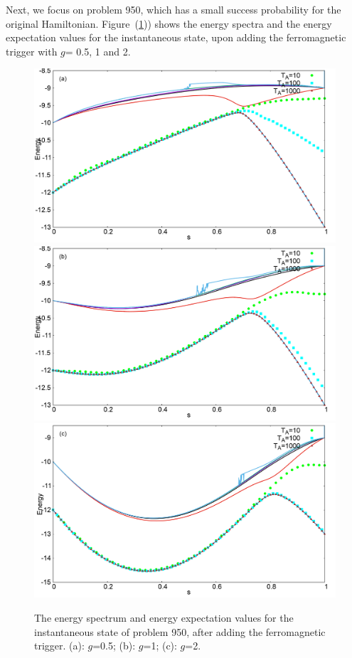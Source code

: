 \documentclass[../main.tex]{subfiles}
\begin{document}
Next, we focus on problem 950, which has a small success probability for the original Hamiltonian. Figure~(\ref{fig:f4})) shows the energy spectra and the energy expectation values for the instantaneous state, upon adding the ferromagnetic trigger with $g$= 0.5, 1 and 2. 
\begin{figure}[H]
\centering 
\includegraphics[scale=0.24]{950_s12_F_g0.png}
\includegraphics[scale=0.24]{950_s12_F_g1.png}
\includegraphics[scale=0.24]{950_s12_F_g2.png}
\caption{The energy spectrum and energy expectation values for the instantaneous state of problem 950, after adding the ferromagnetic trigger. (a): $g$=0.5; (b): $g$=1; (c): $g$=2.}
\label{fig:f4}
\end{figure}
\end{document}
